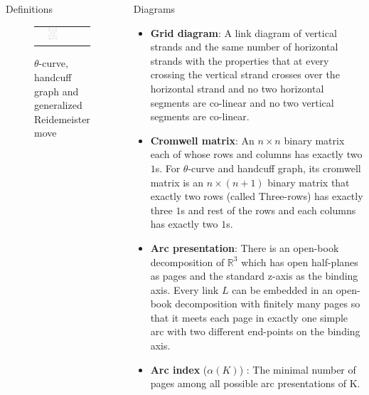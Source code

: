 \documentclass[final]{beamer}
\begin{document}
\begin{frame}[t]
\begin{columns}[t]
\begin{block}{Definitions}
\begin{figure}[h]
\begin{tabular}{ccc}
          \includegraphics[width=0.43\textwidth]{figure/reidemeister.png} \\
        \end{tabular}
        \caption{$\theta$-curve, handcuff graph and generalized Reidemeister move}
    \end{figure}
  \end{block}

  \begin{block}{Diagrams}
    \begin{itemize} 
      \item \textbf{Grid diagram}: A link diagram of vertical strands and the same number of horizontal strands with the properties that at every crossing the vertical strand crosses over the horizontal strand and no two horizontal segments are co-linear and no two vertical segments are co-linear.
      \item \textbf{Cromwell matrix}: An $n\times n$ binary matrix each of whose rows and columns has exactly two $1$s. For $\theta$-curve and handcuff graph, its cromwell matrix is an $n\times(n{+}1)$ binary matrix that exactly two rows (called Three-rows) has exactly three $1$s and rest of the rows and each columns has exactly two $1$s.
      \item \textbf{Arc presentation}: There is an open-book decomposition of $\mathbb{R}^3$ which has open half-planes as pages and the standard z-axis as the binding axis. Every link $L$ can be embedded in an open-book decomposition with finitely many pages so that it meets each page in exactly one simple arc with two different end-points on the binding axis.
      \item \textbf{Arc index} ($\alpha(K)$) : The minimal number of pages among all possible arc presentations of K.
    \end{itemize}


\end{block}
\end{columns}
\end{frame}
\end{document}
